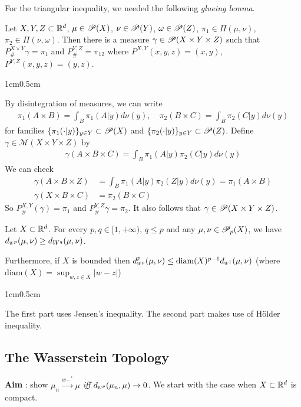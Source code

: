 \documentclass[12pt,a4paper]{article}
\newenvironment{proof}
{\begin{changemargin}{1cm}{0.5cm} 
	}%
	{\end{changemargin}
}
\newenvironment{p}
{\begin{proof} 
	}%
	{\end{proof}
}
\begin{document}
For the triangular inequality, we needed the following \emph{glueing lemma}.
\s

 Let $X, Y, Z \subset \mathbb{R}^d$, $\mu\in \mathscr{P}(X)$, $\nu \in \mathscr{P}(Y)$, $\omega \in \mathscr{P}(Z)$, $\pi_1\in \Pi(\mu, \nu)$, $\pi_2 \in \Pi(\nu, \omega)$. Then there is a measure $\gamma \in \mathscr{P} (X\times Y \times Z)$ such that $P_{\#}^{X\times Y} \gamma = \pi_1$ and $P_{\#}^{Y,Z} = \pi_{12}$ where $P^{X,Y}(x,y,z) = (x,y)$, $P^{Y,Z}(x,y,z) =(y,z)$.
\begin{p}
\pf By disintegration of measures, we can write
\begin{align*}
\pi_1 (A\times B) = \int_B \pi_1(A|y )d\nu(y), \quad \pi_2 (B\times C) = \int_B \pi_2(C|y )d\nu(y)
\end{align*}
for families $\{\pi_1(\cdot |y) \}_{y\in Y} \subset \mathscr{P}(X)$ and $\{\pi_2(\cdot |y) \}_{y\in Y} \subset \mathscr{P}(Z)$. Define $\gamma \in \mathscr{M}(X\times Y\times Z)$ by
\begin{align*}
\gamma(A \times B \times C) = \int_B \pi_1(A|y)\pi_2(C|y) d\nu(y)
\end{align*}
We can check 
\begin{align*}
\gamma(A\times B \times Z) &= \int_B \pi_1(A|y) \pi_2(Z|y) d\nu(y) = \pi_1(A\times B) \\
\gamma(X\times B \times C) &= \pi_2(B\times C)
\end{align*}
So $P_{\#}^{X,Y}(\gamma) = \pi_1$ and $P^{Y, Z}_{\#} \gamma =\pi_2$. It also follows that $\gamma \in \mathscr{P}(X\times Y\times Z)$.

\eop
\end{p}
\s

 Let $X\subset \mathbb{R}^d$. For every $p,q \in [1, +\infty)$, $q\leq p$ and any $\mu, \nu\in \mathscr{P}_p(X)$, we have $\wa{p}(\mu, \nu) \geq d_{W^q} (\mu, \nu)$.

\quad Furthermore, if $X$ is bounded then $\wa{p}^p (\mu, \nu) \leq \text{diam}(X)^{p-1} \wa{1}(\mu, \nu)$ (where $\text{diam}(X) = \sup_{w, z\in X} |w-z|$)
\begin{p}
\pf The first part uses Jensen's inequality. The second part makes use of H\"older inequality.

\eop
\end{p}

\subsection{The Wasserstein Topology}

\textbf{Aim} : show $\mu_n \xrightarrow{w-^*} \mu$ \emph{iff} $\wa{p}(\mu_n,\mu) \rightarrow 0$. We start with the case when $X\subset\mathbb{R}^d$ is compact.
\s
\end{document}
